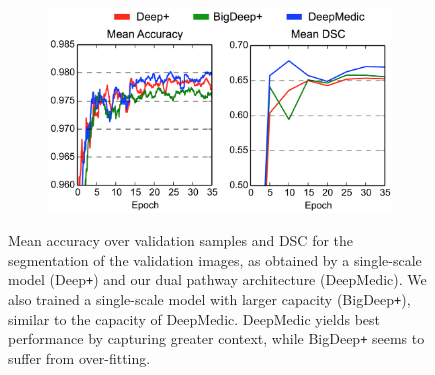\begin{figure}[!h]
\centering
\begin{subfigure}[b]{0.5\textwidth}
\centering
	\includegraphics[clip=true, trim=0pt 0pt 0pt 0pt, width=1.0\textwidth]{figures/validationOfArchitecture/multiscale/figureToPut.png}
\end{subfigure}
\caption{Mean accuracy over validation samples and DSC for the segmentation of the validation images, as obtained by a single-scale model (Deep\texttt{+}) and our dual pathway architecture (DeepMedic). We also trained a single-scale model with larger capacity (BigDeep\texttt{+}), similar to the capacity of DeepMedic. DeepMedic yields best performance by capturing greater context, while BigDeep\texttt{+} seems to suffer from over-fitting.
}
\label{fig:multiscaleExperiment}
\end{figure}
